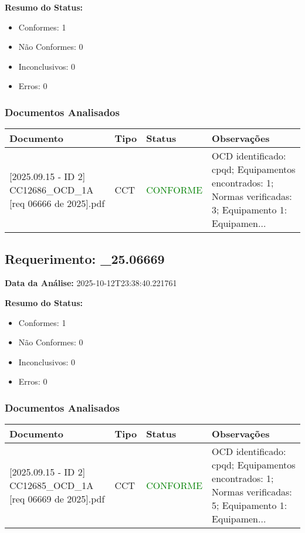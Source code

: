 \documentclass[12pt,a4paper]{article}
\begin{document}
\textbf{Resumo do Status:}
\begin{itemize}
    \item Conformes: 1
    \item Não Conformes: 0
    \item Inconclusivos: 0
    \item Erros: 0
\end{itemize}

\subsubsection{Documentos Analisados}

\begin{longtable}{|p{4cm}|p{2cm}|p{2cm}|p{6cm}|}
\hline
\textbf{Documento} & \textbf{Tipo} & \textbf{Status} & \textbf{Observações} \\
\hline
\endhead
[Certificado de Conformidade Técnica - CCT][2025.09.15 - ID 2] CC12686\_OCD\_1A [req 06666 de 2025].pdf & CCT & \textcolor{green}{CONFORME} & OCD identificado: cpqd; Equipamentos encontrados: 1; Normas verificadas: 3; Equipamento 1: Equipamen... \\
\hline
\end{longtable}


\subsection{Requerimento: \_25.06669}

\textbf{Data da Análise:} 2025-10-12T23:38:40.221761

\textbf{Resumo do Status:}
\begin{itemize}
    \item Conformes: 1
    \item Não Conformes: 0
    \item Inconclusivos: 0
    \item Erros: 0
\end{itemize}

\subsubsection{Documentos Analisados}

\begin{longtable}{|p{4cm}|p{2cm}|p{2cm}|p{6cm}|}
\hline
\textbf{Documento} & \textbf{Tipo} & \textbf{Status} & \textbf{Observações} \\
\hline
\endhead
[Certificado de Conformidade Técnica - CCT][2025.09.15 - ID 2] CC12685\_OCD\_1A [req 06669 de 2025].pdf & CCT & \textcolor{green}{CONFORME} & OCD identificado: cpqd; Equipamentos encontrados: 1; Normas verificadas: 5; Equipamento 1: Equipamen... \\
\hline
\end{longtable}
\end{document}
